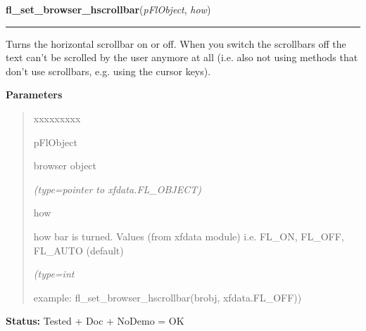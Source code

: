 \hspace{.8\funcindent}\begin{boxedminipage}{\funcwidth}

    \raggedright \textbf{fl\_set\_browser\_hscrollbar}(\textit{pFlObject}, \textit{how})

    \vspace{-1.5ex}

    \rule{\textwidth}{0.5\fboxrule}
\setlength{\parskip}{2ex}
    Turns the horizontal scrollbar on or off. When you switch the 
    scrollbars off the text can't be scrolled by the user anymore at all 
    (i.e. also not using methods that don't use scrollbars, e.g. using the 
    cursor keys).

\setlength{\parskip}{1ex}
      \textbf{Parameters}
      \vspace{-1ex}

      \begin{quote}
        \begin{Ventry}{xxxxxxxxx}

          \item[pFlObject]

          browser object

            {\it (type=pointer to xfdata.FL\_OBJECT)}

          \item[how]

          how bar is turned. Values (from xfdata module) i.e. FL\_ON, 
          FL\_OFF, FL\_AUTO (default)

            {\it (type=int

example: fl\_set\_browser\_hscrollbar(brobj, xfdata.FL\_OFF))}

        \end{Ventry}

      \end{quote}

\textbf{Status:} Tested + Doc + NoDemo = OK



    \end{boxedminipage}

    \label{xformslib:flbrowser:fl_set_browser_line_selectable}

    \vspace{0.5ex}

